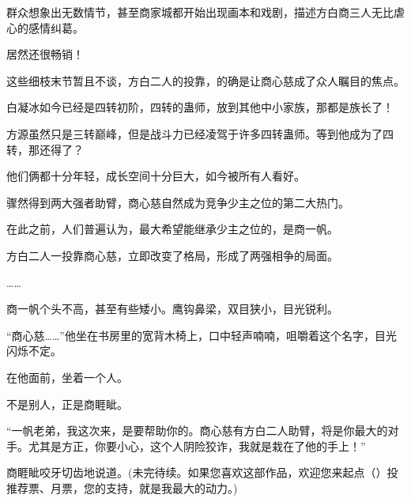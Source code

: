 \begin{this_body}
群众想象出无数情节，甚至商家城都开始出现画本和戏剧，描述方白商三人无比虐心的感情纠葛。

居然还很畅销！

这些细枝末节暂且不谈，方白二人的投靠，的确是让商心慈成了众人瞩目的焦点。

白凝冰如今已经是四转初阶，四转的蛊师，放到其他中小家族，那都是族长了！

方源虽然只是三转巅峰，但是战斗力已经凌驾于许多四转蛊师。等到他成为了四转，那还得了？

他们俩都十分年轻，成长空间十分巨大，如今被所有人看好。

骤然得到两大强者助臂，商心慈自然成为竞争少主之位的第二大热门。

在此之前，人们普遍认为，最大希望能继承少主之位的，是商一帆。

方白二人一投靠商心慈，立即改变了格局，形成了两强相争的局面。

……

商一帆个头不高，甚至有些矮小。鹰钩鼻梁，双目狭小，目光锐利。

“商心慈……”他坐在书房里的宽背木椅上，口中轻声喃喃，咀嚼着这个名字，目光闪烁不定。

在他面前，坐着一个人。

不是别人，正是商睚眦。

“一帆老弟，我这次来，是要帮助你的。商心慈有方白二人助臂，将是你最大的对手。尤其是方正，你要小心，这个人阴险狡诈，我就是栽在了他的手上！”

商睚眦咬牙切齿地说道。(未完待续。如果您喜欢这部作品，欢迎您来起点（）投推荐票、月票，您的支持，就是我最大的动力。)

\end{this_body}

